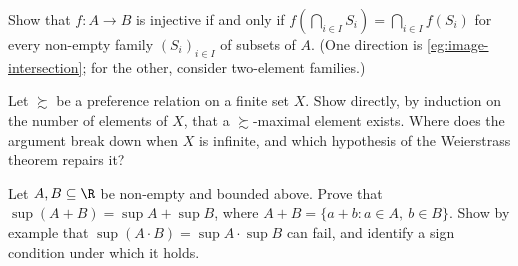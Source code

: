 \begin{exercise}\label{ex:sets-1}
	Show that $f\colon A\to B$ is injective if and only if
	$f\left(\bigcap_{i\in I}S_i\right)=\bigcap_{i\in I}f(S_i)$ for every non-empty
	family $(S_i)_{i\in I}$ of subsets of $A$. (One direction is
	\autoref{eg:image-intersection}; for the other, consider two-element families.)
\end{exercise}

\begin{exercise}\label{ex:sets-2}
	Let $\succsim$ be a preference relation on a finite set $X$. Show directly, by
	induction on the number of elements of $X$, that a $\succsim$-maximal element
	exists. Where does the argument break down when $X$ is infinite, and which
	hypothesis of the Weierstrass theorem repairs it?
\end{exercise}

\begin{exercise}\label{ex:sets-3}
	Let $A,B\subseteq\R$ be non-empty and bounded above. Prove that
	$\sup(A+B)=\sup A+\sup B$, where $A+B=\{a+b : a\in A,\ b\in B\}$. Show by
	example that $\sup(A\cdot B)=\sup A\cdot\sup B$ can fail, and identify a
	sign condition under which it holds.
\end{exercise}
